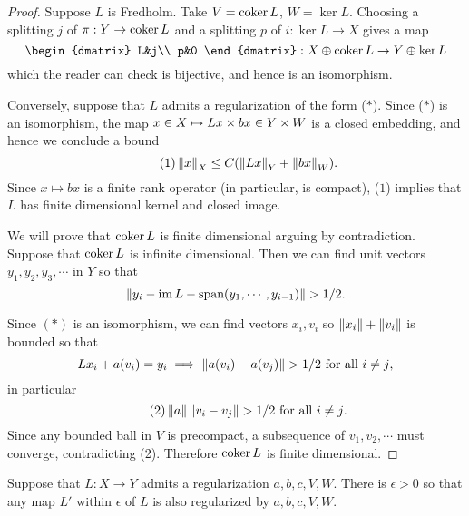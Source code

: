 \documentclass{amsart}
\begin{document}
 \begin{proof}
   Suppose $L$ is Fredholm. Take $V=\operatorname{\mathrm{coker}} L$, $W=\ker L$. Choosing a
   splitting $j$ of $\pi:Y\to \operatorname{\mathrm{coker}} L$ and a splitting $p$ of $i:\ker
   L\to X$ gives a map
   \begin{equation*}
     \begin{dmatrix}
       L&j\\
       p&0
     \end{dmatrix}
     :X\oplus \coker L\to Y\oplus \ker L
   \end{equation*}
   which the reader can check is bijective, and hence is an
   isomorphism.

   Conversely, suppose that $L$ admits a regularization of the form
   ($\ast$). Since ($\ast$) is an isomorphism, the map $x\in X\mapsto
   Lx\times bx\in Y\times W$ is a closed embedding, and hence we
   conclude a bound
   \begin{equation*}\tag{$1$}
     \left\lVert x\right\rVert_{X}\le C(\left\lVert Lx\right\rVert_{Y}+\left\lVert bx\right\rVert_{W}).
   \end{equation*}
   Since $x\mapsto bx$ is a finite rank operator (in particular, is
   compact), ($1$) implies that $L$ has finite dimensional kernel
   and closed image.

   We will prove that $\operatorname{\mathrm{coker}} L$ is finite dimensional arguing by
   contradiction. Suppose that $\operatorname{\mathrm{coker}} L$ is infinite
   dimensional. Then we can find unit vectors $y_{1},y_{2},y_{3},\cdots$ in
   $Y$ so that $$\left\lVert y_{i}-\operatorname{\mathrm{im}}
     L-\text{span}(y_{1},\cdots,y_{i-1})\right\rVert>1/2.$$

   Since $(\ast)$ is an isomorphism, we can find vectors $x_{i},v_{i}$
   so $\left\lVert x_{i}\right\rVert+\left\lVert v_{i}\right\rVert$ is bounded so that
   \begin{equation*}
     Lx_{i}+a(v_{i})=y_{i}\implies \left\lVert a(v_{i})-a(v_{j})\right\rVert>1/2\text{
       for all $i\ne j$},
   \end{equation*}
   in particular
   \begin{equation*}\tag{2}
     \left\lVert a\right\rVert\left\lVert v_{i}-v_{j}\right\rVert>1/2\text{ for all $i\ne j$}.
   \end{equation*}
   Since any bounded ball in $V$ is precompact, a subsequence of
   $v_{1},v_{2},\cdots$ must converge, contradicting (2). Therefore
   $\operatorname{\mathrm{coker}} L$ is finite dimensional.   
 \end{proof}
 \begin{prop}
   Suppose that $L:X\to Y$ admits a regularization $a,b,c,V,W$. There
   is $\epsilon>0$ so that any map $L'$ within $\epsilon$ of $L$
   is also regularized by $a,b,c,V,W$.
 \end{prop}
\end{document}
